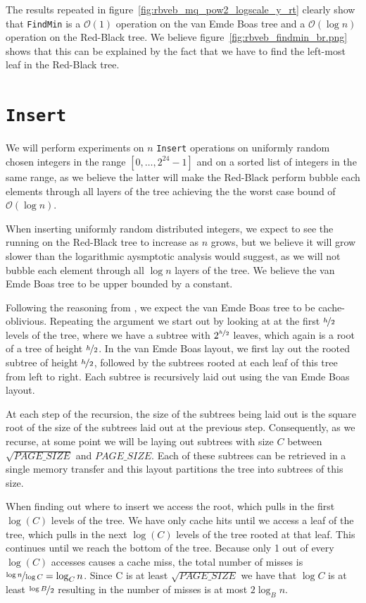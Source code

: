 \documentclass[a4paper,oneside,article,11pt]{memoir}
\begin{document}
The results repeated in figure~\ref{fig:rbveb_mq_pow2_logscale_y_rt} clearly show that \texttt{FindMin} is a $\mathcal{O}(1)$ operation on the van Emde Boas tree and a $\mathcal{O}(\log n)$ operation on the Red-Black tree. We believe figure~\ref{fig:rbveb_findmin_br.png} shows that this can be explained by the fact that we have to find the left-most leaf in the Red-Black tree.

\section{\texttt{Insert}}
We will perform experiments on $n$ \texttt{Insert} operations on uniformly random chosen integers in the range $[0, \dots, 2^{24}-1]$ and on a sorted list of integers in the same range, as we believe the latter will make the Red-Black perform bubble each elements through all layers of the tree achieving the the worst case bound of $\mathcal{O}(\log n)$.

When inserting uniformly random distributed integers, we expect to see the running on the Red-Black tree to increase as $n$ grows, but we believe it will grow slower than the logarithmic aysmptotic analysis would suggest, as we will not bubble each element through all $\log n$ layers of the tree. We believe the van Emde Boas tree to be upper bounded by a constant.

Following the reasoning from \cite{bender}, we expect the van Emde Boas tree to be cache-oblivious. Repeating the argument we start out by looking at at the first $\nicefrac{h}{2}$ levels of the tree, where we have a subtree with $2^{\nicefrac{h}{2}}$ leaves, which again is a root of a tree of height $\nicefrac{h}{2}$.  In the van Emde Boas layout, we first lay out the rooted subtree of height $\nicefrac{h}{2}$, followed by the subtrees rooted at each leaf of this tree from left to right. Each subtree is recursively laid out using the van Emde Boas layout.

At each step of the recursion, the size of the subtrees being laid out is the square root of the size of the subtrees laid out at the previous step. Consequently, as we recurse, at some point we will be laying out subtrees with size $C$ between $\sqrt{PAGE\_SIZE}$ and $PAGE\_SIZE$. Each of these subtrees can be retrieved in a single memory transfer and this layout partitions the tree into subtrees of this size.

When finding out where to insert we access the root, which pulls in the first $\log(C)$ levels of the tree. We have only cache hits until we access a leaf of the tree, which pulls in the next $\log(C)$ levels of the tree rooted at that leaf. This continues until we reach the bottom of the tree. Because only 1 out of every $\log(C)$ accesses causes a cache miss, the total number of misses is $\nicefrac{\log n}{\log C} = \log_C n$. Since C is at least $\sqrt{PAGE\_SIZE}$ we have that $\log C$ is at least $\nicefrac{\log B}{2}$ resulting in the number of misses is at most $2 \log_B n$.
\end{document}
